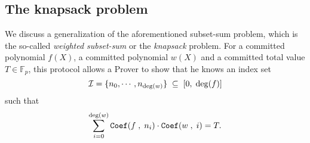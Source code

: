 \documentclass[11pt, lettersize, notitlepage, leqno, footskip=0.6cm]{article}
\newcommand{\bFp}{\mathbb{F}_p}
\newcommand{\wti}{\widetilde}
\newcommand{\mc}{\mathcal}
\newcommand{\mbf}{\mathbf}
\newcommand{\what}{\widehat}
\newcommand{\sub}{\subseteq}
\newcommand{\mP}{\mc{P}}
\newcommand{\V}{\mc{V}}
\newcommand{\vs}{\vspace{-0.15cm}}
\newcommand{\sta}{\stackrel{?}{=}}
\newcommand{\e}{\mbf{e}}
\numberwithin{equation}{section}
\begin{document}
\begin{comment}
\item $\mP$ computes the polynomial \vspace{-2mm} $$ \wti{f}(X):= \sum\limits_{i=0}^{\deg(f)+1} \prod\limits_{j=0}^{i-1} (c_i+\gamma)\cdot  X^i  $$ and sends the elements \vs $$\wti{a}:= g_1^{\wti{f}(s)}\;\;,\;\;\what{a}:= g_1^{[\wti{f}(s)-1]\big/[s-1]} .$$

\item $\mP$ sends a proof for $\hyperlink{ZKPoKE}{\tt{ZKPoKE}}[g_1^{s},\;\wti{a}\cdot g_1^{-1}] $

\item $\mP$ sends a proof for $\hyperlink{HadProd}{\tt{ZKPoHadProd}}[g_1,\;({a}_{\gamma},\;\wti{a}),\;\what{a}] $

\item $\mP$ sends a proof for $\hyperlink{Coef}{\tt{ZKPoCoef}}[g_1,\;(\wti{a},\; a_{\deg}\cdot g_1,\; A)] $.

\item The Verifier $\V$ verifies the $\hyperlink{ZKPoKE}{\tt{ZKPoKE}}$, $\hyperlink{Coef}{\tt{ZKPoCoef}}$, the $\hyperlink{Deg}{\tt{ZKPoDeg}}$s, the $\hyperlink{HadProd}{\tt{ZKPoHadProd}}$ and the (batchable) equations \vs $$ \e(\what{a}\;,\;g_2^{s-1})\;\sta\; \e(\wti{a}\cdot g_1^{-1}\;,\;g_2)\;\;,\;\;\e(\wti{g}_1\cdot g_1^{s-1}\;,\;g_2)\sta \e(a^{-1}\cdot a_{\gamma}\;,\;g_2^{s-1}). \vspace{-3mm} $$ \qed \end{enumerate} \end{mdframed} 



\end{comment}










\subsection{\fontsize{11}{11}\selectfont The knapsack problem}


We discuss a generalization of the aforementioned subset-sum problem, which is the so-called \textit{weighted subset-sum} or the \textit{knapsack} problem. For a committed polynomial $f(X)$, a committed polynomial $w(X)$ and a committed total value $T\in \bFp$, this protocol allows a Prover to show that he knows an index set \vs $$\mc{I} = \{n_0,\cdots,n_{\deg(w)} \}\;\sub\; [0,\;\deg(f)] \vs $$ such that \vs $$ \sum\limits_{i= 0}^{\deg(w)} {\tt{Coef}}(f\;,\;n_i)\cdot {\tt{Coef}}(w\;,\;i) = T . $$ 
\end{document}
